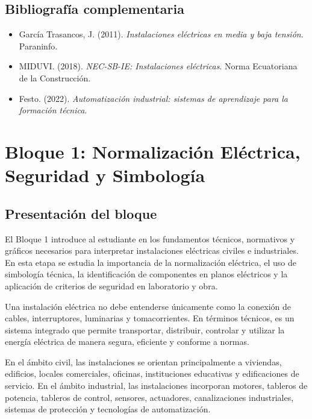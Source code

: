 \documentclass[
  spanish,
  letterpaper,
  DIV=11,
  numbers=noendperiod]{scrreprt}
\providecommand{\tightlist}{%
  \setlength{\itemsep}{0pt}\setlength{\parskip}{0pt}}
\begin{document}
\section{Bibliografía
complementaria}\label{bibliografuxeda-complementaria}

\begin{itemize}
\tightlist
\item
  García Trasancos, J. (2011). \emph{Instalaciones eléctricas en media y
  baja tensión}. Paraninfo.
\item
  MIDUVI. (2018). \emph{NEC-SB-IE: Instalaciones eléctricas}. Norma
  Ecuatoriana de la Construcción.
\item
  Festo. (2022). \emph{Automatización industrial: sistemas de
  aprendizaje para la formación técnica}.
\end{itemize}


\chapter{Bloque 1: Normalización Eléctrica, Seguridad y
Simbología}\label{bloque-1-normalizaciuxf3n-eluxe9ctrica-seguridad-y-simbologuxeda}

\section{Presentación del bloque}\label{presentaciuxf3n-del-bloque}

El Bloque 1 introduce al estudiante en los fundamentos técnicos,
normativos y gráficos necesarios para interpretar instalaciones
eléctricas civiles e industriales. En esta etapa se estudia la
importancia de la normalización eléctrica, el uso de simbología técnica,
la identificación de componentes en planos eléctricos y la aplicación de
criterios de seguridad en laboratorio y obra.

Una instalación eléctrica no debe entenderse únicamente como la conexión
de cables, interruptores, luminarias y tomacorrientes. En términos
técnicos, es un sistema integrado que permite transportar, distribuir,
controlar y utilizar la energía eléctrica de manera segura, eficiente y
conforme a normas.

En el ámbito civil, las instalaciones se orientan principalmente a
viviendas, edificios, locales comerciales, oficinas, instituciones
educativas y edificaciones de servicio. En el ámbito industrial, las
instalaciones incorporan motores, tableros de potencia, tableros de
control, sensores, actuadores, canalizaciones industriales, sistemas de
protección y tecnologías de automatización.
\end{document}
